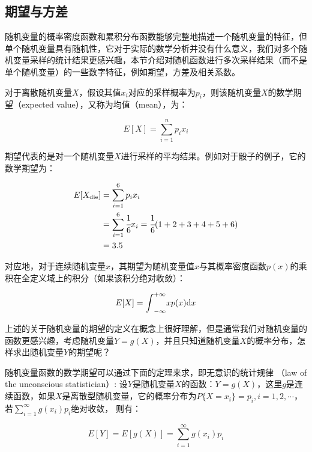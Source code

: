 \subsection{期望与方差}
随机变量的概率密度函数和累积分布函数能够完整地描述一个随机变量的特征，但单个随机变量具有随机性，它对于实际的数学分析并没有什么意义，我们对多个随机变量采样的统计结果更感兴趣，本节介绍对随机函数进行多次采样结果（而不是单个随机变量）的一些数字特征，例如期望，方差及相关系数。

对于离散随机变量$X$，假设其值$x_i$对应的采样概率为$p_i$，则该随机变量$X$的数学期望（expected value），又称为均值（mean），为：

\begin{equation}\label{eq:mc-expected-value}
	E[X]=\sum_{i=1}^{n}p_i x_i
\end{equation} 

期望代表的是对一个随机变量$X$进行采样的平均结果。例如对于骰子的例子，它的数学期望为：

\begin{equation}
	\begin{aligned}
		E[X_{\rm die}]&=\sum_{i=1}^{6}p_i x_i\\
		&=\sum_{i=1}^{6} \cfrac{1}{6}x_i = \cfrac{1}{6}(1+2+3+4+5+6)\\
		&=3.5
	\end{aligned}
\end{equation}

对应地，对于连续随机变量$x$，其期望为随机变量值$x$与其概率密度函数$p(x)$的乘积在全定义域上的积分（如果该积分绝对收敛）：

\begin{equation}\label{eq:mc-continuous-e}
	E[X]={\rm \int}_{-\infty}^{+\infty}xp(x){\rm d}x
\end{equation}

上述的关于随机变量的期望的定义在概念上很好理解，但是通常我们对随机变量的函数更感兴趣，考虑随机变量$Y=g(X)$，并且只知道随机变量$X$的概率分布，怎样求出随机变量$Y$的期望呢？

随机变量函数的数学期望可以通过下面的定理来求，即无意识的统计规律
（law of the unconscious statistician）: 设$Y$是随机变量$X$的函数：$Y=g(X)$，这里$g$是连续函数，如果$X$是离散型随机变量，它的概率分布为$P\{X=x_i\}=p_i,i=1,2,\cdots$，若$\sum^{\infty}_{i=1}g(x_i)p_i$绝对收敛， 则有：

\begin{equation}
	E[Y]=E[g(X)]=\sum^{\infty}_{i=1}g(x_i)p_i
\end{equation}

